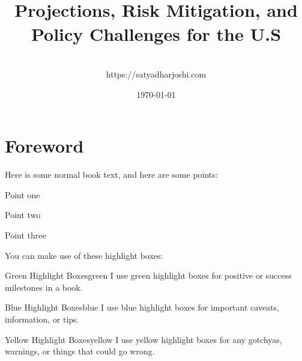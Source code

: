 \documentclass[a4paper,headinclude=on,footinclude=on,12pt,oneside]{scrbook}
\begin{document}
\title{\\\small{Projections, Risk Mitigation, and Policy Challenges for the U.S}}
\author{
    \\https://satyadharjoshi.com
}
\date{\today}

\maketitle
\tableofcontents

\listoffigures
{}

\listoflistings
{}

\chapter*{Foreword}


Here is some normal book text, and here are some points:

\begin{arrows}
\item Point one
\item Point two
\item Point three
\end{arrows}


You can make use of these highlight boxes:

\begin{highlightBox}{Green Highlight Boxes}{green}{\greenCheck}
I use green highlight boxes for positive or success milestones in a book.
\end{highlightBox}

\begin{highlightBox}{Blue Highlight Boxes}{blue}{\information}
I use blue highlight boxes for important caveats, information, or tips.
\end{highlightBox}

\begin{highlightBox}{Yellow Highlight Boxes}{yellow}{\warning}
I use yellow highlight boxes for any gotchyas, warnings, or things that could go wrong.
\end{highlightBox}
\end{document}
